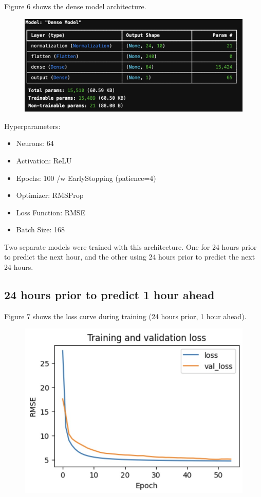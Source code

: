 \documentclass[9pt,a4paper,twoside]{rho}
\begin{document}
\noindent Figure 6 shows the dense model architecture.
\begin{figure}[H]
	\centering
	\includegraphics[width=0.8\columnwidth]{Figures/Dense_Architecture.png}
\end{figure}

\noindent Hyperparameters:
\begin{itemize}
	\item Neurons: 64
	\item Activation: ReLU
	\item Epochs: 100 /w EarlyStopping (patience=4)
	\item Optimizer: RMSProp
	\item Loss Function: RMSE
	\item Batch Size: 168
\end{itemize}

Two separate models were trained with this architecture. One for 24 hours prior to predict the next hour, and the other using 24 hours prior to predict the next 24 hours.

\subsection*{24 hours prior to predict 1 hour ahead}

\noindent Figure 7 shows the loss curve during training (24 hours prior, 1 hour ahead).
\begin{figure}[H]
	\centering
	\includegraphics[width=0.8\columnwidth]{Figures/Dense_24_1_Learning.png}
\end{figure}
\end{document}
